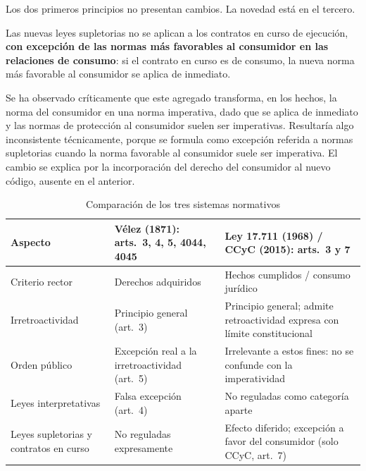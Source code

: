 \documentclass[12pt,oneside]{book}
\begin{document}
Los dos primeros principios no presentan cambios. La novedad está en el tercero.

\begin{importante}
Las nuevas leyes supletorias no se aplican a los contratos en curso de ejecución, \textbf{con excepción de las normas más favorables al consumidor en las relaciones de consumo}: si el contrato en curso es de consumo, la nueva norma más favorable al consumidor se aplica de inmediato.
\end{importante}

\begin{nota}
Se ha observado críticamente que este agregado transforma, en los hechos, la norma del consumidor en una norma imperativa, dado que se aplica de inmediato y las normas de protección al consumidor suelen ser imperativas. Resultaría algo inconsistente técnicamente, porque se formula como excepción referida a normas supletorias cuando la norma favorable al consumidor suele ser imperativa. El cambio se explica por la incorporación del derecho del consumidor al nuevo código, ausente en el anterior.
\end{nota}

\begin{table}[H]
\centering
\begin{tabularx}{\textwidth}{B{0.20\textwidth} Y Y}
\toprule
\textbf{Aspecto} & \textbf{Vélez (1871): arts.~3, 4, 5, 4044, 4045} & \textbf{Ley 17.711 (1968) / CCyC (2015): arts.~3 y 7} \\
\midrule
Criterio rector & Derechos adquiridos & Hechos cumplidos / consumo jurídico \\
Irretroactividad & Principio general (art.~3) & Principio general; admite retroactividad expresa con límite constitucional \\
Orden público & Excepción real a la irretroactividad (art.~5) & Irrelevante a estos fines: no se confunde con la imperatividad \\
Leyes interpretativas & Falsa excepción (art.~4) & No reguladas como categoría aparte \\
Leyes supletorias y contratos en curso & No reguladas expresamente & Efecto diferido; excepción a favor del consumidor (solo CCyC, art.~7) \\
\bottomrule
\end{tabularx}
\caption{Comparación de los tres sistemas normativos}
\end{table}
\end{document}
